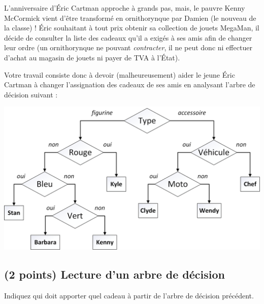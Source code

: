 \documentclass[11pt,a4paper]{article}
\begin{document}
\noindent L'anniversaire d'\'Eric Cartman approche à grands pas, mais, le pauvre Kenny McCormick vient d'être transformé en ornithorynque par Damien (le nouveau de la classe) !
\'Eric souhaitant à tout prix obtenir sa collection de jouets MegaMan, il décide de consulter la liste des cadeaux qu'il a exigés à ses \og amis \fg{} afin de changer leur ordre (un ornithorynque ne pouvant \textit{contracter}, il ne peut donc ni effectuer d'achat au magasin de jouets ni payer de TVA à l'\'Etat).

\noindent Votre travail consiste donc à devoir (malheureusement) aider le jeune \'Eric Cartman à changer l'assignation des cadeaux de ses \og amis \fg{} en analysant l'arbre de décision suivant :

\begin{center}
\includegraphics[scale=0.60]{img/DecisionTree_Cartman_MegaMan.png}
\end{center}


\subsection{(2 points) Lecture d'un arbre de décision}

\noindent Indiquez qui doit apporter quel cadeau à partir de l'arbre de décision précédent.

\end{document}
